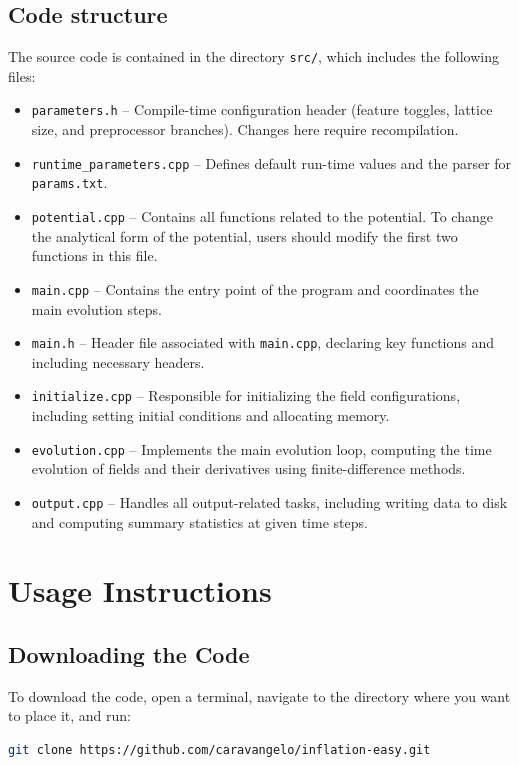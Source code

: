 \documentclass[aps, nofootinbib,superscriptaddress, preprintnumbers, longbibliography]{article}
\begin{document}
    \subsection{Code structure}
    \label{sec:structure}
   The source code is contained in the directory \texttt{src/}, which includes the following files:
\begin{itemize}
\item \texttt{parameters.h} – Compile-time configuration header (feature toggles, lattice size, and preprocessor branches). Changes here require recompilation.
\item \texttt{runtime\_parameters.cpp} – Defines default run-time values and the parser for \texttt{params.txt}.
\item \texttt{potential.cpp} – Contains all functions related to the potential. To change the analytical form of the potential, users should modify the first two functions in this file.
\item \texttt{main.cpp} – Contains the entry point of the program and coordinates the main evolution steps.
\item \texttt{main.h} – Header file associated with \texttt{main.cpp}, declaring key functions and including necessary headers.
\item \texttt{initialize.cpp} – Responsible for initializing the field configurations, including setting initial conditions and allocating memory.
\item \texttt{evolution.cpp} – Implements the main evolution loop, computing the time evolution of fields and their derivatives using finite-difference methods.
\item \texttt{output.cpp} – Handles all output-related tasks, including writing data to disk and computing summary statistics at given time steps.
\end{itemize}


\section{Usage Instructions}
\label{sec:instructions}
\subsection{Downloading the Code}
To download the code, open a terminal, navigate to the directory where you want to place it, and run:
\begin{lstlisting}[language=bash,numbers=none]
git clone https://github.com/caravangelo/inflation-easy.git
\end{lstlisting}
\end{document}

